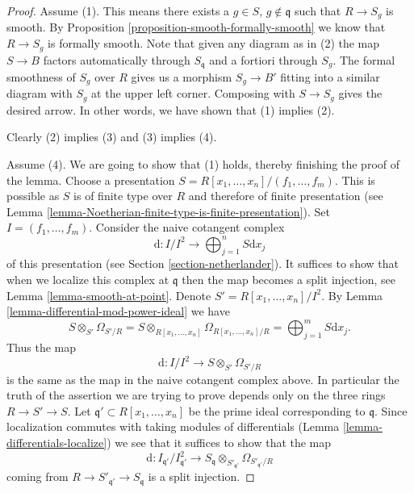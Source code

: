 \documentclass[10pt,a4paper]{amsart}
\theoremstyle{plain}
\theoremstyle{definition}
\theoremstyle{remark}
\numberwithin{equation}{subsection}
\begin{document}
\begin{proof}
Assume (1). This means there exists a $g \in S$, $g \not \in \mathfrak q$
such that $R \to S_g$ is smooth. By
Proposition \ref{proposition-smooth-formally-smooth}
we know that $R \to S_g$ is formally smooth. Note that given any diagram
as in (2) the map $S \to B$ factors automatically through $S_{\mathfrak q}$
and a fortiori through $S_g$. The formal smoothness of $S_g$ over $R$
gives us a morphism $S_g \to B'$ fitting into a similar diagram with $S_g$ at
the upper left corner. Composing with $S \to S_g$ gives the desired arrow.
In other words, we have shown that (1) implies (2).

\medskip\noindent
Clearly (2) implies (3) and (3) implies (4).

\medskip\noindent
Assume (4). We are going to show that (1) holds, thereby finishing the
proof of the lemma. Choose a presentation
$S = R[x_1, \ldots, x_n]/(f_1, \ldots, f_m)$.
This is possible as $S$ is of finite type over $R$ and therefore of finite
presentation (see
Lemma \ref{lemma-Noetherian-finite-type-is-finite-presentation}).
Set $I = (f_1, \ldots, f_m)$.
Consider the naive cotangent complex
$$
\text{d} : I/I^2
\longrightarrow
\bigoplus\nolimits_{j = 1}^n S\text{d}x_j
$$
of this presentation (see Section \ref{section-netherlander}).
It suffices to show that when we localize this complex at $\mathfrak q$
then the map becomes a split injection, see Lemma \ref{lemma-smooth-at-point}.
Denote $S' = R[x_1, \ldots, x_n]/I^2$.
By Lemma \ref{lemma-differential-mod-power-ideal} we have
$$
S \otimes_{S'} \Omega_{S'/R} =
S \otimes_{R[x_1, \ldots, x_n]} \Omega_{R[x_1, \ldots, x_n]/R} =
\bigoplus\nolimits_{j = 1}^m S\text{d}x_j.
$$
Thus the map
$$
\text{d} :
I/I^2
\longrightarrow
S \otimes_{S'} \Omega_{S'/R}
$$
is the same as the map in the naive cotangent complex above. In particular
the truth of the assertion we are trying to prove
depends only on the three rings $R \to S' \to S$.
Let $\mathfrak q' \subset R[x_1, \ldots, x_n]$ be the prime ideal
corresponding to $\mathfrak q$. Since
localization commutes with taking modules of differentials
(Lemma \ref{lemma-differentials-localize}) we see that it suffices to show
that the map
\begin{equation}
\label{equation-target-map}
\text{d} :
I_{\mathfrak q'}/I_{\mathfrak q'}^2
\longrightarrow
S_{\mathfrak q} \otimes_{S'_{\mathfrak q'}} \Omega_{S'_{\mathfrak q'}/R}
\end{equation}
coming from $R \to S'_{\mathfrak q'} \to S_{\mathfrak q}$
is a split injection.


\end{proof}
\end{document}
